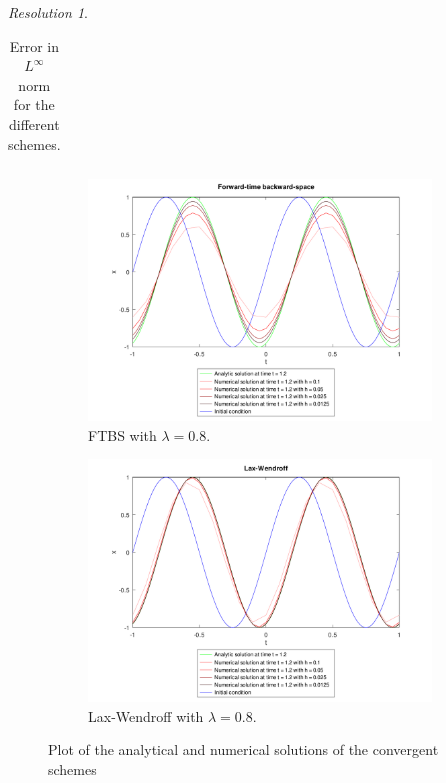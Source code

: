 \documentclass[10pt,a4paper]{article}
\theoremstyle{definition}
\theoremstyle{remark}
\newtheorem*{res}{Resolution}
\begin{document}
\begin{res}
\begin{table}[ht]
\begin{tabular}{|c|c|c|c|c||c|c|c|c|}
      \hline
    \end{tabular}
    \caption{Error in $L^\infty$ norm for the different schemes.}
  \end{table}
  \begin{figure}[ht]
    \centering
    \begin{subfigure}{0.49\textwidth}
      \centering
      \includegraphics[width=\textwidth]{Images/ex2-ftbs.pdf}
      \caption{FTBS with $\lambda=0.8$.}
    \end{subfigure}\hfill
    \begin{subfigure}{0.49\textwidth}
      \centering
      \includegraphics[width=\textwidth]{Images/ex2-lw.pdf}
      \caption{Lax-Wendroff with $\lambda=0.8$.}
    \end{subfigure}
    \caption{Plot of the analytical and numerical solutions of the convergent schemes}
  \end{figure}
\end{res}
\end{document}
